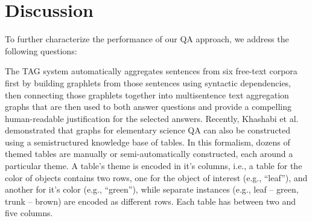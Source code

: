 \section{Discussion}
\label{sec-cl2017:discussion}

To further characterize the performance of our QA approach, we address the following questions: 


%

{} The TAG system automatically aggregates sentences from six free-text corpora first by building graphlets from those sentences using syntactic dependencies, then connecting those graphlets together into multisentence text aggregation graphs that are then used to both answer questions and provide a compelling human-readable justification for the selected answers.  Recently, Khashabi et al. \citeyear{Khashabi2016QuestionAV} demonstrated that graphs for elementary science QA can also be constructed using a semistructured knowledge base of tables.  In this formalism, dozens of themed tables are manually or semi-automatically constructed, each around a particular theme.  A table's theme is encoded in it's columns, i.e., a table for the color of objects contains two rows, one for the object of interest (e.g., ``leaf''), and another for it's color (e.g., ``green''), while separate instances (e.g., leaf -- green, trunk -- brown) are encoded as different rows.  Each table has between two and five columns.  

